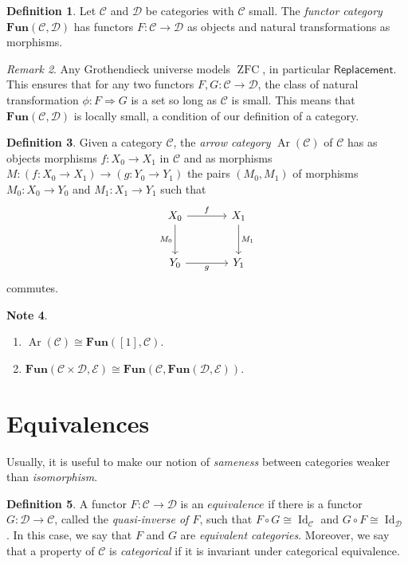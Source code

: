 \documentclass[10pt,letterpaper,cm]{nupset}
\theoremstyle{definition}
\newtheorem{definition}{Definition}[section]
\newtheorem{note}[definition]{Note}
\theoremstyle{theorem}
\theoremstyle{remark}
\newtheorem{remark}[definition]{Remark}
\newcommand{\1}{\mathbf{1}}
\renewcommand{\c}{\mathscr{C}}
\renewcommand{\d}{\mathscr{D}}
\newcommand{\e}{\mathscr{E}}
\newcommand{\0}{\vec 0}
\DeclareMathOperator{\id}{Id}
\DeclareMathOperator{\ar}{Ar}
\DeclareMathOperator{\ZFC}{ZFC}
\begin{document}
\smallskip

\begin{definition}
Let $\c$ and $\d$ be categories with $\c$ small. The \textit{functor category $\mathbf{Fun}(\c, \d)$} has functors $F: \c \to \d$ as objects and natural transformations as morphisms. 
\end{definition}


\begin{remark}
Any Grothendieck universe models $\ZFC$, in particular $\mathsf{Replacement}$. This ensures that for any two functors $F, G: \c \to \d$, the class of natural transformation $\phi: F \Rightarrow G$ is a set so long as $\c$ is small. This means that $\mathbf{Fun}(\c, \d)$ is locally small, a condition of our definition of a category.
\end{remark}

\begin{definition}
Given a category $\c$, the \textit{arrow category} $\ar(\c)$ of $\c$ has as objects morphisms $f: X_0 \to X_1$ in $\c$ and as morphisms $M: \left(f: X_0 \to X_1\right) \to \left(g: Y_0 \to Y_1\right)$ the pairs $\left(M_0, M_1\right)$ of morphisms $M_0 : X_0 \to Y_0$ and $M_1 : X_1 \to Y_1$ such that
\[
\begin{tikzcd}[row sep=large, column sep = large]
X_0 \arrow[r, "f"] \arrow[d, "M_0", swap]
& X_1 \arrow[d, "M_1"] \\
Y_0 \arrow[r, "g"']
& Y_1
\end{tikzcd}
\]
commutes. 
\end{definition}

\begin{note} $ $
\begin{enumerate}
\item $\ar(\c) \cong \mathbf{Fun}([1], \c)$.
\item $\mathbf{Fun}(\c \times \d, \e) \cong \mathbf{Fun}(\c, \mathbf{Fun}( \d, \e))$. 
\end{enumerate}
\end{note}

\section{Equivalences}

Usually, it is useful to make our notion of \textit{sameness} between categories weaker than \textit{isomorphism}.

\begin{definition}
A functor $F: \c \to \d$ is an $\textit{equivalence}$ if there is a functor $G: \d \to \c$, called the \textit{quasi-inverse of $F$}, such that $F \circ G \cong \id_{\c}$ and $G \circ F \cong \id_{\d}$. In this case, we say that $F$ and $G$ are \textit{equivalent categories}. Moreover, we say that a property of $\c$ is \textit{categorical} if it is invariant under categorical equivalence.
\end{definition}
\end{document}
